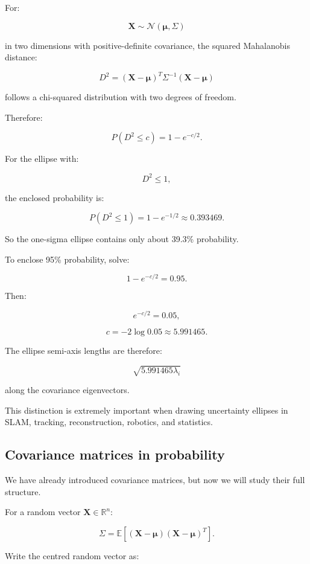 For:

\[
 \mathbf X\sim\mathcal N(\boldsymbol\mu,\Sigma)
\]

in two dimensions with positive-definite covariance, the squared Mahalanobis distance:

\[
 D^2= (\mathbf X-\boldsymbol\mu)^T \Sigma^{-1} (\mathbf X-\boldsymbol\mu)
\]

follows a chi-squared distribution with two degrees of freedom.

Therefore:

\[
 P(D^2\le c)=1-e^{-c/2}.
\]

For the ellipse with:

\[
 D^2\le1,
\]

the enclosed probability is:

\[
 \boxed{ P(D^2\le1)=1-e^{-1/2}\approx0.393469 }.
\]

So the one-sigma ellipse contains only about 39.3\% probability.

To enclose 95\% probability, solve:

\[
 1-e^{-c/2}=0.95.
\]

Then:

\[
 e^{-c/2}=0.05,
\]

\[
 c=-2\log0.05\approx5.991465.
\]

The ellipse semi-axis lengths are therefore:

\[
 \sqrt{5.991465\lambda_i}
\]

along the covariance eigenvectors.

This distinction is extremely important when drawing uncertainty ellipses in SLAM, tracking, reconstruction, robotics, and statistics.

\subsection{Covariance matrices in probability}\label{02-foundations-ii-ch024-covariance-matrices-in-probability}

\hypertarget{02-foundations-ii-ch024-covariance-matrices-in-probability}{}

We have already introduced covariance matrices, but now we will study their full structure.

For a random vector \(\mathbf X\in\mathbb R^n\):

\[
 \boxed{ \Sigma= \mathbb E[ (\mathbf X-\boldsymbol\mu) (\mathbf X-\boldsymbol\mu)^T ] }.
\]

Write the centred random vector as:

